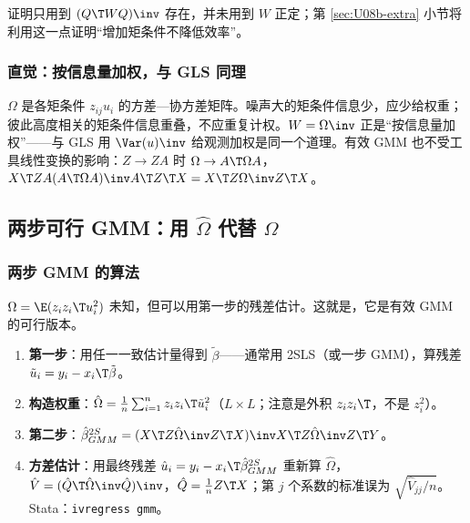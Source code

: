 证明只用到 $(Q\T WQ)\inv$ 存在，并未用到 $W$ 正定；第 \ref{sec:U08b-extra} 小节将利用这一点证明“增加矩条件不降低效率”。

\subsubsection{直觉：按信息量加权，与 GLS 同理}

$\Omega$ 是各矩条件 $z_{ij}u_i$ 的方差—协方差矩阵。噪声大的矩条件信息少，应少给权重；彼此高度相关的矩条件信息重叠，不应重复计权。$W=\Omega\inv$ 正是“按信息量加权”——与 GLS 用 $\Var(u)\inv$ 给观测加权是同一个道理。有效 GMM 也不受工具线性变换的影响：$Z\to ZA$ 时 $\Omega\to A\T\Omega A$，$X\T ZA(A\T\Omega A)\inv A\T Z\T X=X\T Z\Omega\inv Z\T X$。

\subsection{两步可行 GMM：用 \texorpdfstring{$\hat\Omega$}{Omega-hat} 代替 \texorpdfstring{$\Omega$}{Omega}}\label{sec:U08b-twostep}

\subsubsection{两步 GMM 的算法}

$\Omega=\E(z_iz_i\T u_i^2)$ 未知，但可以用第一步的残差估计。这就是，它是有效 GMM 的可行版本。

\begin{method}[两步 GMM]
\begin{enumerate}
  \item \textbf{第一步}：用任一一致估计量得到 $\tilde\beta$——通常用 2SLS（或一步 GMM），算残差 $\tilde u_i=y_i-x_i\T\tilde\beta$。
  \item \textbf{构造权重}：$\hat\Omega=\frac1n\sum_{i=1}^nz_iz_i\T\tilde u_i^2$（$L\times L$；注意是外积 $z_iz_i\T$，不是 $z_i^2$）。
  \item \textbf{第二步}：$\hat\beta^{2S}_{GMM}=(X\T Z\hat\Omega\inv Z\T X)\inv X\T Z\hat\Omega\inv Z\T Y$。
  \item \textbf{方差估计}：用最终残差 $\hat u_i=y_i-x_i\T\hat\beta^{2S}_{GMM}$ 重新算 $\hat\Omega$，$\hat V=(\hat Q\T\hat\Omega\inv\hat Q)\inv$，$\hat Q=\frac1nZ\T X$；第 $j$ 个系数的标准误为 $\sqrt{\hat V_{jj}/n}$。Stata：\texttt{ivregress gmm}。
\end{enumerate}
\end{method}

